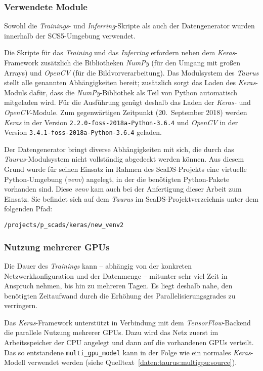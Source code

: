 \subsubsection{Verwendete Module}
\label{daten:taurus:module}

Sowohl die \textit{Trainings}- und \textit{Inferring}-Skripte als auch der Datengenerator wurden innerhalb der
SCS5-Umgebung verwendet.

Die Skripte für das \textit{Training} und das \textit{Inferring} erfordern neben dem \textit{Keras}-Framework zusätzlich
die Bibliotheken \textit{NumPy} (für den Umgang mit großen Arrays) und \textit{OpenCV} (für die Bildvorverarbeitung).
Das Modulsystem des \textit{Taurus} stellt alle genannten Abhängigkeiten bereit; zusätzlich sorgt das Laden des
\textit{Keras}-Moduls dafür, dass die \textit{NumPy}-Bibliothek als Teil von Python automatisch mitgeladen wird. Für die
Ausführung genügt deshalb das Laden der \textit{Keras-} und \textit{OpenCV}-Module. Zum gegenwärtigen Zeitpunkt
(20.\ September 2018) werden \textit{Keras} in der Version \texttt{2.2.0-foss-2018a-Python-3.6.4} und \textit{OpenCV} in
der Version \texttt{3.4.1-foss-2018a-Python-3.6.4} geladen.

Der Datengenerator bringt diverse Abhängigkeiten mit sich, die durch das \textit{Taurus}-Modulsystem nicht vollständig
abgedeckt werden können. Aus diesem Grund wurde für seinen Einsatz im Rahmen des ScaDS-Projekts eine virtuelle
Python-Umgebung (\textit{venv}) angelegt, in der die benötigten Python-Pakete vorhanden sind. Diese \textit{venv} kam
auch bei der Anfertigung dieser Arbeit zum Einsatz. Sie befindet sich auf dem \textit{Taurus} im
ScaDS-Projektverzeichnis unter dem folgenden Pfad:

\texttt{/projects/p\_scads/keras/new\_venv2}

\subsubsection{Nutzung mehrerer GPUs}
\label{daten:taurus:multigpu}

Die Dauer des \textit{Trainings} kann -- abhängig von der konkreten Netzwerkkonfiguration und der Datenmenge -- mitunter
sehr viel Zeit in Anspruch nehmen, bis hin zu mehreren Tagen. Es liegt deshalb nahe, den benötigten Zeitaufwand durch
die Erhöhung des Parallelisierungsgrades zu verringern.

Das \textit{Keras}-Framework unterstützt in Verbindung mit dem \textit{TensorFlow}-Backend die parallele Nutzung
mehrerer GPUs. Dazu wird das Netz zuerst im Arbeitsspeicher der CPU angelegt und dann auf die vorhandenen GPUs verteilt.
Das so entstandene \texttt{multi\_gpu\_model} kann in der Folge wie ein normales \textit{Keras}-Modell verwendet werden
(siehe Quelltext~\ref{daten:taurus:multigpu:source}).

